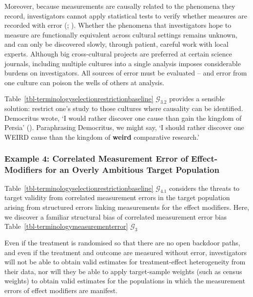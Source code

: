 \documentclass[
  single column]{article}
\begin{document}
Moreover, because measurements are causally related to the phenomena
they record, investigators cannot apply statistical tests to verify
whether measures are recorded with error
(;
). Whether
the phenomena that investigators hope to measure are functionally
equivalent across cultural settings remains unknown, and can only be
discovered slowly, through patient, careful work with local experts.
Although big cross-cultural projects are preferred at certain science
journals, including multiple cultures into a single analysis imposes
considerable burdens on investigators. All sources of error must be
evaluated -- and error from one culture can poison the wells of others
at analysis.

Table~\ref{tbl-terminologyselectionrestrictionbaseline}
\(\mathcal{G}_{3.2}\) provides a sensible solution: restrict one's study
to those cultures where causality can be identified. Democritus wrote,
`I would rather discover one cause than gain the kingdom of Persia'
(). Paraphrasing
Democritus, we might say, `I should rather discover one WEIRD cause than
the kingdom of \textbf{weird} comparative research.'

\subsubsection{Example 4: Correlated Measurement Error of
Effect-Modifiers for an Overly Ambitious Target
Population}\label{example-4-correlated-measurement-error-of-effect-modifiers-for-an-overly-ambitious-target-population}

Table~\ref{tbl-terminologyselectionrestrictionbaseline}
\(\mathcal{G}_{4.1}\) considers the threats to target validity from
correlated measurement errors in the target population arising from
structured errors linking measurements for the effect modifiers. Here,
we discover a familiar structural bias of correlated measurement error
bias Table~\ref{tbl-terminologymeasurementerror} \(\mathcal{G}_3\)

Even if the treatment is randomised so that there are no open backdoor
paths, and even if the treatment and outcome are measured without error,
investigators will not be able to obtain valid estimates for
treatment-effect heterogeneity from their data, nor will they be able to
apply target-sample weights (such as census weights) to obtain valid
estimates for the populations in which the measurement errors of effect
modifiers are manifest.
\end{document}

